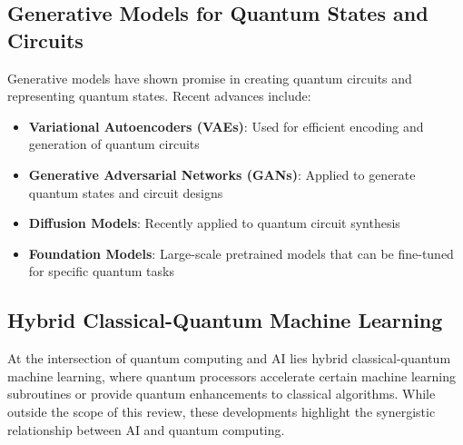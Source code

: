 \subsection{Generative Models for Quantum States and Circuits}
Generative models have shown promise in creating quantum circuits and representing quantum states. Recent advances include:
\begin{itemize}
    \item \textbf{Variational Autoencoders (VAEs)}: Used for efficient encoding and generation of quantum circuits
    \item \textbf{Generative Adversarial Networks (GANs)}: Applied to generate quantum states and circuit designs
    \item \textbf{Diffusion Models}: Recently applied to quantum circuit synthesis \cite{furrutter2024quantum}
    \item \textbf{Foundation Models}: Large-scale pretrained models that can be fine-tuned for specific quantum tasks
\end{itemize}

\subsection{Hybrid Classical-Quantum Machine Learning}
At the intersection of quantum computing and AI lies hybrid classical-quantum machine learning, where quantum processors accelerate certain machine learning subroutines or provide quantum enhancements to classical algorithms. While outside the scope of this review, these developments highlight the synergistic relationship between AI and quantum computing. 